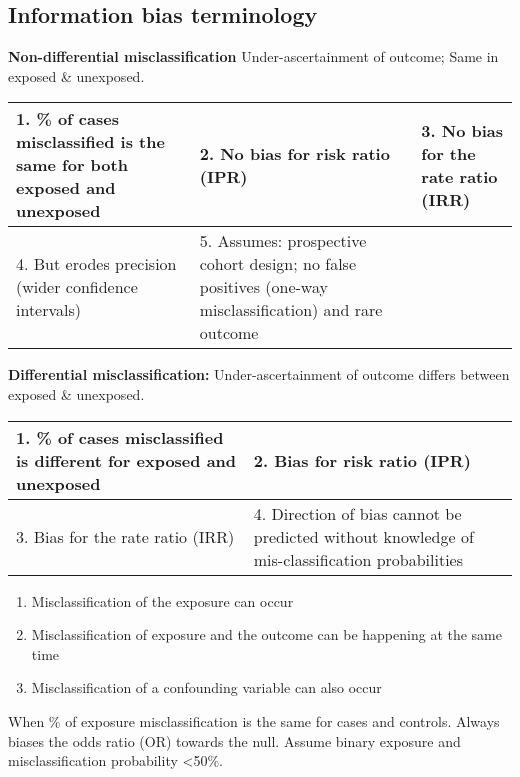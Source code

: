 \documentclass[landscape]{article}
\newcommand{\squeezeupp}{\vspace{-2mm}}
\begin{document}
\begin{multicols}{3}
	\squeezeupp{}
	\subsection{Information bias terminology}
	
		\squeezeupp{}
		\textbf{Non-differential misclassification} Under-ascertainment of outcome; Same in exposed \& unexposed.
				\begin{tiny}
				\begin{tabular}{p{2.5cm}|p{2.5cm}|p{2.5cm}}
						1. \% of cases misclassified is the same for both exposed and unexposed &
						2. No bias for risk ratio (IPR) &
						3. No bias for the rate ratio (IRR) \\ \hline
						4. But erodes precision (wider confidence intervals) &
						5. Assumes: prospective cohort design; no false positives (one-way misclassification) and rare outcome & \\ \hline
				\end{tabular}%
				\end{tiny}

			\textbf{Differential misclassification:} Under-ascertainment of outcome differs between exposed \& unexposed.
				\begin{tiny}
				\begin{tabular}{p{3.5cm}|p{4.5cm}}
					1. \% of cases misclassified is different for exposed and unexposed &
					2. Bias for risk ratio (IPR) \\ \hline
					3. Bias for the rate ratio (IRR) &
					4. Direction of bias cannot be predicted without knowledge of mis-classification probabilities \\ \hline
				\end{tabular}%
				\end{tiny}

		\begin{description}
			\item[Other]
				\begin{enumerate}
					\item{Misclassification of the exposure can occur}
					\item{Misclassification of exposure and the outcome can be happening at the same time}
					\item{Misclassification of a confounding variable can also occur}
				\end{enumerate}
					\item[Applied to case-control studies] When \% of exposure misclassification is the same for cases and controls. Always biases the odds ratio (OR) towards the null. Assume binary exposure and misclassification probability <50\%.
		\end{description}
				

\end{multicols}
\end{document}
